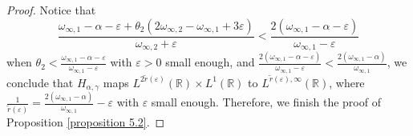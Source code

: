 \documentclass[11pt, twoside, leqno]{article}
\theoremstyle{definition}
\numberwithin{equation}{section}
\begin{document}
\begin{proof}
Notice that $$\frac{\omega_{\infty,1}-\alpha-\varepsilon+ \theta_2(2\omega_{\infty,2}- \omega_{\infty,1} +3\varepsilon)}{\omega_{\infty,2}+\varepsilon}<\frac{2(\omega_{\infty,1}-\alpha-\varepsilon)}{\omega_{\infty,1}-\varepsilon}$$ when $\theta_2<\frac{\omega_{\infty,1}-\alpha-\varepsilon}{\omega_{\infty,1}-\varepsilon}$ with $\varepsilon>0$ small enough, and $\frac{2(\omega_{\infty,1}-\alpha-\varepsilon)}{\omega_{\infty,1}-\varepsilon}<\frac{2(\omega_{\infty,1}-\alpha)}{\omega_{\infty,1}}$, we conclude that $H_{\alpha,\gamma}$ maps $L^{2\tilde{r}( \varepsilon )}(\mathbb{R})\times L^{1   }(\mathbb{R})$ to $L^{\tilde{r}(\varepsilon ), \infty}(\mathbb{R})$, where $\frac{1}{\tilde{r}( \varepsilon ) }=\frac{2(\omega_{\infty,1}-\alpha)}{\omega_{\infty,1}}-\varepsilon $ with $\varepsilon$ small enough. Therefore, we finish the proof of Proposition \ref{proposition 5.2}.
\end{proof}

\bigskip
\end{document}
